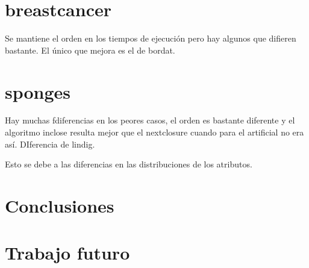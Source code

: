 \documentclass{article}
\begin{document}
\section{breastcancer}
Se mantiene el orden en los tiempos de ejecución pero hay algunos que difieren bastante. El único que mejora es el de bordat.
\section{sponges}
Hay muchas fdiferencias en los peores casos, el orden es bastante diferente y el algoritmo inclose resulta mejor que el nextclosure cuando para el artificial no era así. DIferencia de lindig.

Esto se debe a las diferencias en las distribuciones de los atributos.

\section{Conclusiones}


\section{Trabajo futuro}
\end{document}
